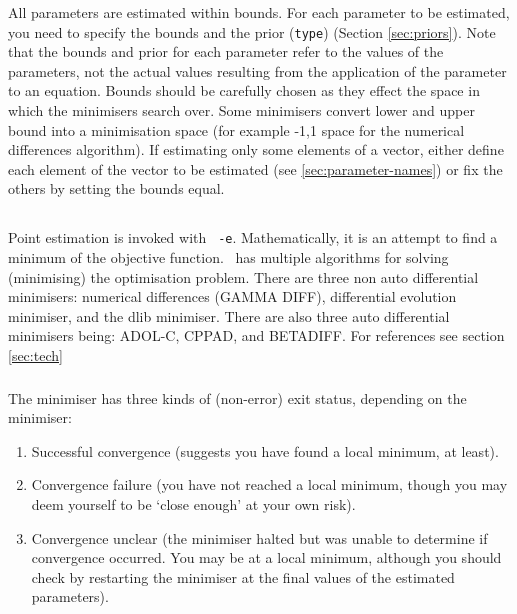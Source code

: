 All parameters are estimated within bounds. For each parameter to be estimated, you need to specify the bounds and the prior (\texttt{type}) (Section \ref{sec:priors}). Note that the bounds and prior for each parameter refer to the values of the parameters, not the actual values resulting from the application of the parameter to an equation. Bounds should be carefully chosen as they effect the space in which the minimisers search over. Some minimisers convert lower and upper bound into a minimisation space (for example -1,1 space for the numerical differences algorithm). If estimating only some elements of a vector, either define each element of the vector to be estimated (see \ref{sec:parameter-names}) or fix the others by setting the bounds equal.

\subsection{\label{sec:estimate-MPD}}
Point estimation is invoked with \texttt{\cname\ -e}. Mathematically, it is an attempt to find a minimum of the objective function. \CNAME\ has multiple algorithms for solving (minimising) the optimisation problem. There are three non auto differential minimisers: numerical differences (GAMMA DIFF), differential evolution minimiser, and the dlib minimiser. There are also three auto differential minimisers being: ADOL-C, CPPAD, and BETADIFF. For references see section \ref{sec:tech}
\subsubsection{}

The minimiser has three kinds of (non-error) exit status, depending on the minimiser: 

\begin{enumerate}
\item Successful convergence (suggests you have found a local minimum, at least).
\item Convergence failure (you have not reached a local minimum, though you may deem yourself to be `close enough' at your own risk).
\item Convergence unclear (the minimiser halted but was unable to determine if convergence occurred. You may be at a local minimum, although you should check by restarting the minimiser at the final values of the estimated parameters).
\end{enumerate}

